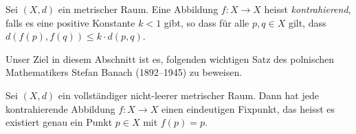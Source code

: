 \documentclass[../main.tex]{subfiles}
\begin{document}
\begin{definition}
  Sei $(X, d)$ ein metrischer Raum.
  Eine Abbildung $f \colon X \to X$ heisst \emph{kontrahierend},
  falls es eine positive Konstante $k < 1$ gibt,
  so dass für alle $p, q \in X$ gilt,
  dass $d(f(p), f(q)) \leq k \cdot d(p, q)$.
\end{definition}

Unser Ziel in diesem Abschnitt ist es,
folgenden wichtigen Satz des polnischen
Mathematikers Stefan Banach (1892--1945)
zu beweisen.

\begin{theorem*}
  Sei $(X, d)$ ein vollständiger nicht-leerer metrischer Raum.
  Dann hat jede kontrahierende Abbildung
  $f \colon X \to X$ einen eindeutigen Fixpunkt,
  das heisst es existiert genau ein Punkt $p \in X$ 
  mit $f(p) = p$.
\end{theorem*}
\end{document}
